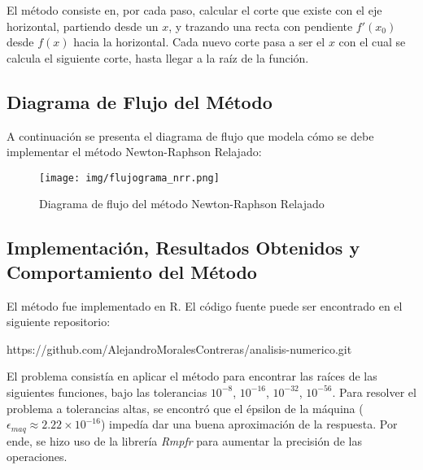 \documentclass[a4paper,12pt]{article}
\begin{document}
El método consiste en, por cada paso, calcular el corte que existe con el eje horizontal, partiendo desde un $x$, y trazando una recta con pendiente $f'(x_0)$ desde $f(x)$ hacia la horizontal. Cada nuevo corte pasa a ser el $x$ con el cual se calcula el siguiente corte, hasta llegar a la raíz de la función.

\newpage

\subsection{Diagrama de Flujo del Método}

A continuación se presenta el diagrama de flujo que modela cómo se debe implementar el método Newton-Raphson Relajado: \par 

\vspace{1em}

\begin{figure}[h!]
\centering
\texttt{[image: img/flujograma\_nrr.png]}
\vspace{-1em}
\caption{Diagrama de flujo del método Newton-Raphson Relajado}
\label{fig:flujograma_nrr}
\end{figure}

\newpage

\subsection{Implementación, Resultados Obtenidos y Comportamiento del Método}

El método fue implementado en R. El código fuente puede ser encontrado en el siguiente repositorio: \par

\vspace{1em}
https://github.com/AlejandroMoralesContreras/analisis-numerico.git \par
\vspace{1em}

El problema consistía en aplicar el método para encontrar las raíces de las siguientes funciones, bajo las tolerancias $10^{-8}$, $10^{-16}$, $10^{-32}$, $10^{-56}$. Para resolver el problema a tolerancias altas, se encontró que el épsilon de la máquina ($\epsilon_{maq} \approx 2.22 \times 10^{-16}$) impedía dar una buena aproximación de la respuesta. Por ende, se hizo uso de la librería \emph{Rmpfr} para aumentar la precisión de las operaciones. \par
\end{document}

